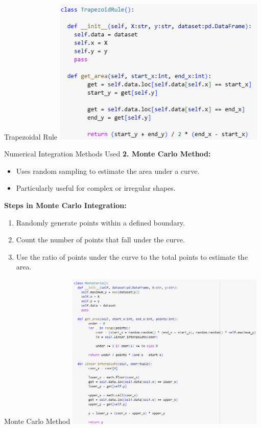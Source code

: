 \documentclass[10pt]{beamer}
\begin{document}
\begin{frame}{Trapezoidal Rule}
    \centering
    \includegraphics[height=7cm]{Trapezoid Rule.png}
\end{frame}

\begin{frame}{Numerical Integration Methods Used}
    \textbf{2. Monte Carlo Method:}
    \begin{itemize}
        \item Uses random sampling to estimate the area under a curve.
        \item Particularly useful for complex or irregular shapes.
    \end{itemize}
    \singlespacing
    \textbf{Steps in Monte Carlo Integration:}
    \begin{enumerate}
        \item Randomly generate points within a defined boundary.
        \item Count the number of points that fall under the curve.
        \item Use the ratio of points under the curve to the total points to estimate the area.
    \end{enumerate}
\end{frame}

\begin{frame}{Monte Carlo Method}
    \centering
    \includegraphics[height=7.5cm]{Monte Carlo.png}
\end{frame}
\end{document}
